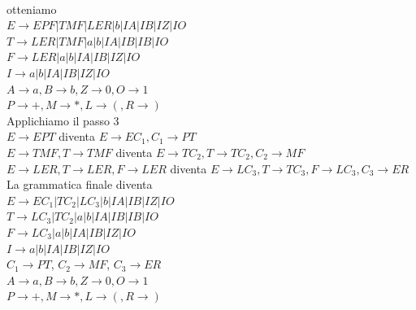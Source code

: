 \documentclass[12pt]{article}
\begin{document}
\vspace{5mm}
\\ otteniamo 
\\ $E\rightarrow EPF | TMF | LER | b | IA | IB | IZ | IO   $
\\ $T\rightarrow LER | TMF | a | b | IA | IB | IB | IO$
\\ $F\rightarrow LER | a | b | IA | IB | IZ | IO$
\\ $I\rightarrow a | b | IA | IB | IZ | IO $
\\ $A \rightarrow a, B \rightarrow b, Z \rightarrow 0, O \rightarrow 1 $
\\ $P \rightarrow +, M \rightarrow *, L \rightarrow (, R \rightarrow ) $
\vspace{5mm}
\\ Applichiamo il passo 3
\\ $E \rightarrow EPT$ diventa $E \rightarrow EC_1, C_1 \rightarrow PT$
\vspace{2mm}
\\ $E \rightarrow TMF, T \rightarrow TMF$ diventa $E \rightarrow TC_2,T \rightarrow TC_2, C_2 \rightarrow MF$
\vspace{2mm}
\\ $E \rightarrow LER, T \rightarrow LER, F \rightarrow LER$ diventa $E \rightarrow LC_3,T \rightarrow TC_3, F \rightarrow LC_3, C_3 \rightarrow ER$
\vspace{5mm}
\\ La grammatica finale diventa 
\\ $E\rightarrow EC_1 | TC_2 | LC_3 | b | IA | IB | IZ | IO   $
\\ $T\rightarrow LC_3 | TC_2 | a | b | IA | IB | IB | IO$
\\ $F\rightarrow LC_3 | a | b | IA | IB | IZ | IO$
\\ $I\rightarrow a | b | IA | IB | IZ | IO $
\\ $C_1 \rightarrow PT$, $C_2 \rightarrow MF$, $C_3 \rightarrow ER$
\\ $A \rightarrow a, B \rightarrow b, Z \rightarrow 0, O \rightarrow 1 $
\\ $P \rightarrow +, M \rightarrow *, L \rightarrow (, R \rightarrow ) $
\end{document}

